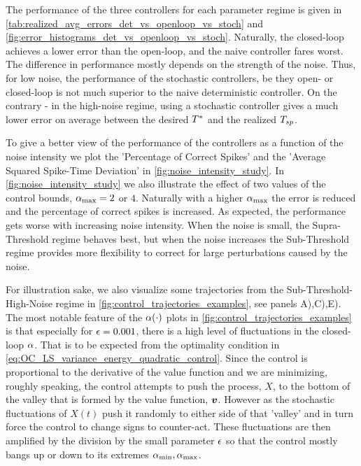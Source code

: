 The performance of the three controllers for each parameter regime is given in
\cref{tab:realized_avg_errors_det_vs_openloop_vs_stoch} and
\cref{fig:error_histograms_det_vs_openloop_vs_stoch}. Naturally, the closed-loop
achieves a lower error than the open-loop, and the naive controller fares worst.
The difference in performance mostly depends on the strength of the noise. Thus,
for low noise, the performance of the stochastic controllers, be they open- or
closed-loop is not much superior to the naive deterministic controller. On the
contrary - in the high-noise regime, using a stochastic controller gives a much
lower error on average between the desired ${ T^* }$ and the realized $T_{sp}$.

To give a better view of the performance of the controllers as a function of the
noise intensity we plot the 'Percentage of Correct Spikes' and the 'Average
Squared Spike-Time Deviation' in \cref{fig:noise_intensity_study}.
In \cref{fig:noise_intensity_study} we also illustrate the effect of two
values of the control bounds, ${ \alpha_{\textrm{max}} }=2$ or $4$. Naturally with a higher ${ \alpha_{\textrm{max}} }$
the error is reduced and the percentage of correct spikes is increased.
As expected, the performance gets worse with increasing noise intensity. When
the noise is small, the Supra-Threshold regime behaves best, but when the noise
increases the Sub-Threshold regime provides more flexibility to correct for
large perturbations caused by the noise. 

For illustration sake, we also visualize some trajectories from the
Sub-Threshold-High-Noise regime in \cref{fig:control_trajectories_examples}, see
panels A),C),E). The most notable feature of the $\alpha(\cdot)$ plots in
\cref{fig:control_trajectories_examples} is that especially for ${\epsilon}=0.001$,
there is a high level of fluctuations in the closed-loop $\alpha$. That is to be
expected from the optimality condition in
\cref{eq:OC_LS_variance_energy_quadratic_control}. Since the control is
proportional to the derivative of the value function and we are minimizing,
roughly speaking, the control attempts to push the process, $X$, to the bottom
of the valley that is formed by the value function, ${ \boldsymbol{v} }$. However as the
stochastic fluctuations of $X(t)$ push it randomly to either side of that
'valley' and in turn force the control to change signs to counter-act.
These fluctuations are then amplified by the division by the small parameter
${\epsilon}$ so that the control mostly bangs up or down to its extremes
${ \alpha_{\textrm{min}} }, { \alpha_{\textrm{max}} }$.
 

